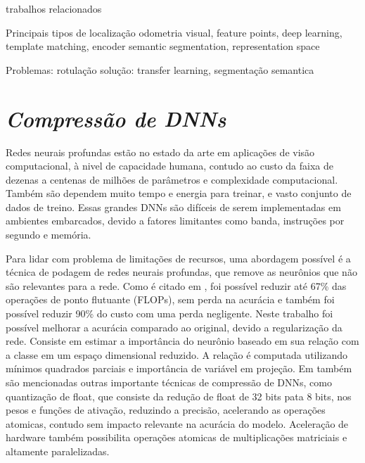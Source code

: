 trabalhos relacionados 



\cite{rs13194017}

Principais tipos de localização
odometria visual, feature points, deep learning, template matching, encoder
semantic segmentation, representation space

Problemas: 
  rotulação
   solução: transfer learning, segmentação semantica 


\section{\textit{Compressão de DNNs}}\label{sec:Cap2_MR}


Redes neurais profundas estão no estado da arte em aplicações de visão computacional, à nivel de capacidade humana, contudo ao custo da faixa de dezenas a centenas de milhões de parâmetros e complexidade computacional. Também são dependem muito tempo e energia para treinar, e vasto conjunto de dados de treino. Essas grandes DNNs são difíceis de serem implementadas em ambientes embarcados, devido a fatores limitantes como banda, instruções por segundo e memória. 

Para lidar com problema de limitações de recursos, uma abordagem possível é a técnica de podagem de redes neurais profundas, que remove as neurônios que não são relevantes para a rede. Como é citado em \cite{jordao2019pruning}, foi possível reduzir até 67\% das operações de ponto flutuante (FLOPs), sem perda na acurácia e também foi possível reduzir 90\% do custo com uma perda negligente. Neste trabalho foi possível melhorar a acurácia comparado ao original, devido a regularização da rede. Consiste em estimar a importância do neurônio baseado em sua relação com a classe em um espaço dimensional reduzido. A relação é computada utilizando mínimos quadrados parciais e importância de variável em projeção. Em \cite{jordao2019pruning} também são mencionadas outras importante técnicas de compressão de DNNs, como quantização de float, que consiste da redução de float de 32 bits pata 8 bits, nos pesos e funções de ativação, reduzindo a precisão, acelerando as operações atomicas, contudo sem impacto relevante na acurácia do modelo. Aceleração de hardware também possibilita operações atomicas de multiplicações matriciais e altamente paralelizadas. 


